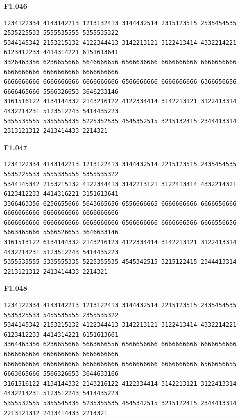 \noindent\begin{minipage}{\linewidth}\textbf{F1.046}
\begin{lstlisting}
1234122334 4143142213 1213132413 3144432514 2315123515 2535454535 2535225533 5555535555 5355535322
5344145342 2153215132 4122344413 3142213121 3122413414 4332214221 6123412233 4414314221 6151613641
3326463356 6236655666 5646666656 6566636666 6666666666 6666656666 6666666666 6666666666 6666666666
6666666666 6666666666 6666666666 6566666666 6666666666 6366656656 6666465666 5566326653 3646233146
3161516122 4134144332 2143216122 4122334414 3142213121 3122413314 4432214231 5123512243 5414435223
5355535555 5355555335 5225352535 4545352515 3215132415 2344413314 2313121312 2413414433 2214321
\end{lstlisting}
\end{minipage}\par\smallskip

\noindent\begin{minipage}{\linewidth}\textbf{F1.047}
\begin{lstlisting}
1234122334 4143142213 1213122413 3144432514 2215123515 2435454535 5535225533 5555335555 5355535322
5344145342 2153215132 4122344413 3142213121 3122413414 4332214321 6123412233 4414316221 3151613641
3366463356 6256655666 5643665656 6556666665 6666666666 6666656666 6666666666 6666666666 6666666666
6666666666 6666666666 6666666666 6566666666 6666666566 6666556656 5663465666 5566526653 3646633146
3161513122 6134144332 2143216123 4122334414 3142213121 3122413314 4432214231 5123512243 5414435223
5355535555 5335555335 5225355535 4545342515 3215122415 2344413314 2213121312 2413414433 2214321
\end{lstlisting}
\end{minipage}\par\smallskip

\noindent\begin{minipage}{\linewidth}\textbf{F1.048}
\begin{lstlisting}
1234122334 4143142213 1213122413 3144432514 2215123515 2435454535 5535325533 5455535555 2355535322
5344145342 2153215132 4122344413 3142213121 3122413414 4332214221 6123412233 4414314221 6151613661
3364463356 6236655666 5663666556 6566656666 6666666666 6666656666 6666666666 6666666666 6666666666
6666666666 6666666666 6666666666 6566666666 6666666666 6566656655 6663665666 5566326653 3644633166
3161516122 4134144332 2143216122 4122334414 3142213121 3122413314 4432214231 5123512243 5414435223
5355532555 5355545335 5235355535 4545342515 3215122415 2344413314 2213121312 2413414433 2214321
\end{lstlisting}
\end{minipage}\par\smallskip

